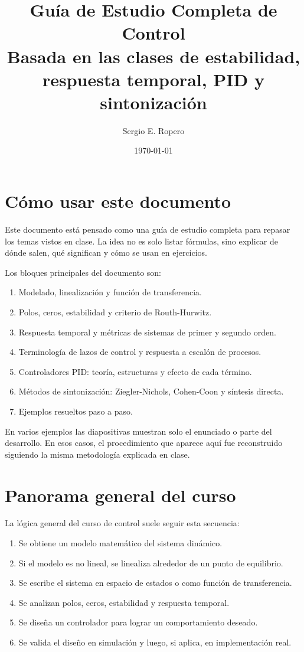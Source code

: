 \documentclass[11pt]{article}
\title{Gu\'ia de Estudio Completa de Control\\
\large Basada en las clases de estabilidad, respuesta temporal, PID y sintonizaci\'on}
\author{Sergio E. Ropero}
\date{\today}
\begin{document}
\maketitle
\tableofcontents
\newpage

\section{C\'omo usar este documento}
Este documento est\'a pensado como una gu\'ia de estudio completa para repasar los temas vistos en clase. La idea no es solo listar f\'ormulas, sino explicar de d\'onde salen, qu\'e significan y c\'omo se usan en ejercicios.

Los bloques principales del documento son:
\begin{enumerate}[label=\arabic*.]
\item Modelado, linealizaci\'on y funci\'on de transferencia.
\item Polos, ceros, estabilidad y criterio de Routh-Hurwitz.
\item Respuesta temporal y m\'etricas de sistemas de primer y segundo orden.
\item Terminolog\'ia de lazos de control y respuesta a escal\'on de procesos.
\item Controladores PID: teor\'ia, estructuras y efecto de cada t\'ermino.
\item M\'etodos de sintonizaci\'on: Ziegler-Nichols, Cohen-Coon y s\'intesis directa.
\item Ejemplos resueltos paso a paso.
\end{enumerate}

En varios ejemplos las diapositivas muestran solo el enunciado o parte del desarrollo. En esos casos, el procedimiento que aparece aqu\'i fue reconstruido siguiendo la misma metodolog\'ia explicada en clase.

\section{Panorama general del curso}
La l\'ogica general del curso de control suele seguir esta secuencia:
\begin{enumerate}[label=\arabic*.]
\item Se obtiene un modelo matem\'atico del sistema din\'amico.
\item Si el modelo es no lineal, se linealiza alrededor de un punto de equilibrio.
\item Se escribe el sistema en espacio de estados o como funci\'on de transferencia.
\item Se analizan polos, ceros, estabilidad y respuesta temporal.
\item Se dise\~na un controlador para lograr un comportamiento deseado.
\item Se valida el dise\~no en simulaci\'on y luego, si aplica, en implementaci\'on real.
\end{enumerate}
\end{document}
